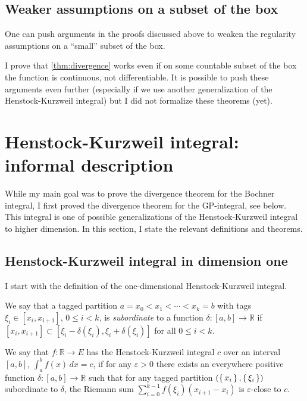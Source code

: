 \documentclass[a4paper, UKenglish,cleveref, autoref, thm-restate]{lipics-v2021}
\newcommand{\bbR}{\mathbb{R}}
\newcommand{\eps}{\varepsilon}
\begin{document}
\subsection{Weaker assumptions on a subset of the box}

One can push arguments in the proofs discussed above to weaken the
regularity assumptions on a “small” subset of the box.

I prove that \autoref{thm:divergence} works even if on some countable
subset of the box the function is continuous, not differentiable. It
is possible to push these arguments even further (especially if we use
another generalization of the Henstock-Kurzweil integral) but I did
not formalize these theorems (yet).

\section{Henstock-Kurzweil integral: informal description}\label{sec:henst-kurzw-informal}

While my main goal was to prove the divergence theorem for the Bochner
integral, I first proved the divergence theorem for the GP-integral,
see below. This integral is one of possible generalizations of the
Henstock-Kurzweil integral to higher dimension. In this section, I
state the relevant definitions and theorems.

\subsection{Henstock-Kurzweil integral in dimension one}\label{sec:HK-integral-dim1}
I start with the definition of the one-dimensional Henstock-Kurzweil
integral.

\begin{definition}%
  \label{def:Henstock}
  We say that a tagged partition \(a=x_{0}<x_{1}<\cdots<x_{k}=b\) with
  tags \(\xi_{i}\in[x_{i}, x_{i+1}]\), \(0\le i<k\), is
  \emph{subordinate} to a function \(\delta\colon[a, b]\to \bbR\) if
  \([x_{i}, x_{i+1}]\subset [\xi_{i}-\delta(\xi_{i}),
  \xi_{i}+\delta(\xi_{i})]\) for all \(0\le i<k\).

  We say that \(f\colon \bbR\to E\) has the Henstock-Kurzweil integral
  \(c\) over an interval \([a, b]\), \(\int_{a}^{b}f(x)\,dx=c\), if
  for any \(\eps>0\) there exists an everywhere positive function
  \(\delta\colon [a, b]\to \bbR\) such that for any tagged partition
  \((\set{x_{i}}, \set{\xi_{i}})\) subordinate to \(\delta\), the
  Riemann sum
  \(\displaystyle\sum_{i=0}^{k-1}f(\xi_{i})(x_{i+1}-x_{i}) \) is
  \(\eps\)-close to \(c\).
\end{definition}
\end{document}
